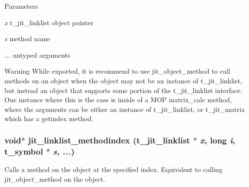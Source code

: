 \begin{DoxyParams}{Parameters}
\item[{\em x}]t\_\-jit\_\-linklist object pointer \item[{\em s}]method name \item[{\em ...}]untyped arguments\end{DoxyParams}
\begin{DoxyWarning}{Warning}
While exported, it is recommend to use jit\_\-object\_\-method to call methods on an object when the object may not be an instance of t\_\-jit\_\-linklist, but instead an object that supports some portion of the t\_\-jit\_\-linklist interface. One instance where this is the case is inside of a MOP matrix\_\-calc method, where the arguments can be either an instance of t\_\-jit\_\-linklist, or t\_\-jit\_\-matrix which has a getindex method. 
\end{DoxyWarning}
\hypertarget{group__linklistmod_ga0c9f6670c63e65887edca9f67a6982ec}{
\subsubsection[{jit\_\-linklist\_\-methodindex}]{\setlength{\rightskip}{0pt plus 5cm}void$\ast$ jit\_\-linklist\_\-methodindex (t\_\-jit\_\-linklist $\ast$ {\em x}, \/  long {\em i}, \/  {\bf t\_\-symbol} $\ast$ {\em s}, \/   {\em ...})}}
\label{group__linklistmod_ga0c9f6670c63e65887edca9f67a6982ec}


Calls a method on the object at the specified index. Equivalent to calling jit\_\-object\_\-method on the object.


